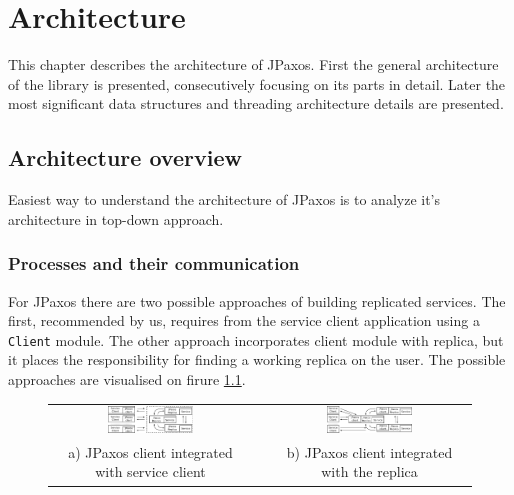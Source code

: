 \chapter{Architecture}

This chapter describes the architecture of JPaxos.
First the general architecture of the library is presented, consecutively focusing on its parts in detail.
Later the most significant data structures and threading architecture details are presented.

\section{Architecture overview}
\indent\par
Easiest way to understand the architecture of JPaxos is to analyze it's architecture in top-down approach.

\subsection{Processes and their communication}

For JPaxos there are two possible approaches of building replicated services. The first, recommended by us, requires from the service client application using a \texttt{Client} module. The other approach incorporates client module with replica, but it places the responsibility for finding a working replica on the user. The possible approaches are visualised on firure \ref{fig:jpaxos_processes}.

\begin{figure}[h]
 \begin{tabular}{ccc}
  \includegraphics[width=0.44\textwidth]{architecture/userArchitecture1.pdf}
  &
  \hspace{0.02\textwidth}
  &
  \includegraphics[width=0.44\textwidth]{architecture/userArchitecture2.pdf}
  \\ 
  \scriptsize a) JPaxos client integrated with service client
  & & 
  \scriptsize b) JPaxos client integrated with the replica\\
 \end{tabular}
 \label{fig:jpaxos_processes}
\end{figure}

